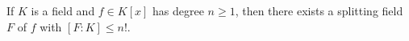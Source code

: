 If $K$ is a field and $f \in K[x]$ has degree $n \geq 1$, then there exists a splitting field $F$ of $f$ with $[F : K] \leq n!$.
